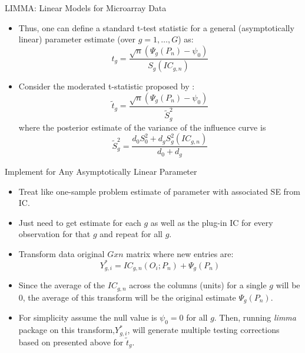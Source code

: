 \documentclass[12pt,t]{beamer}
\begin{document}
\begin{frame}[c]{LIMMA: Linear Models for Microarray Data}

\begin{center}
\begin{itemize}
\item Thus, one can define a standard t-test statistic for a general (asymptotically linear) parameter estimate (over $g=1,\ldots,G$) as:
\[
t_g = \frac{\sqrt{n}(\Psi_g(P_n)-\psi_0)}{S_g(IC_{g,n})}
\]
\item Consider the moderated t-statistic proposed by \cite{Smyth:2005qy}:
\[
\tilde{t}_g = \frac{\sqrt{n}(\Psi_g(P_n)-\psi_0)}{\tilde{S}_g^2}
\]
where the posterior estimate of the variance of the influence curve is  
\[
\tilde{S}^2_g = \frac{d_0 S^2_0 +d_g S^2_g(IC_{g,n})}{d_0+d_g}
\]
\end{itemize}
\end{center}


\end{frame}



\begin{frame}[c]{Implement for Any Asymptotically Linear Parameter}

\begin{center}
\begin{itemize}
\item Treat like one-sample problem estimate of parameter with associated SE from IC.
\item Just need to get estimate for each $g$ as well as the plug-in IC for every observation for that $g$ and repeat for all $g$.
\item Transform data original $G x n$ matrix where new entries are:
\[
Y^*_{g,i} = IC_{g,n}(O_i; P_n)+\Psi_g(P_n)
\]
\item Since the average of the $IC_{g,n}$ across the columns (units) for a single $g$ will be 0, the average of this transform will be the original estimate $\Psi_g(P_n)$.
\item For simplicity assume the null value is $\psi_0 = 0$ for all $g$.  Then, running {\em limma} package on this transform,$Y^*_{g,i}$,  will generate multiple testing corrections based on presented above for $\tilde{t}_g$.
\end{itemize}
\end{center}


\end{frame}
\end{document}
